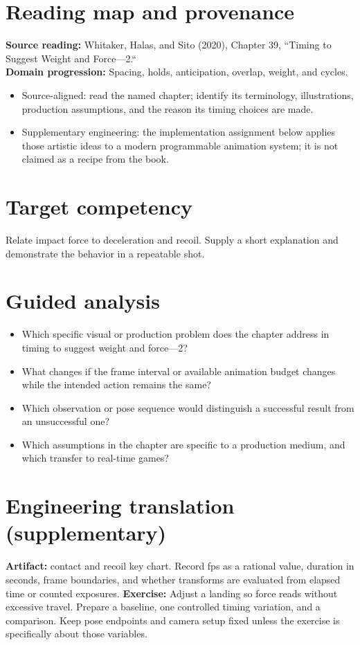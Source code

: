 \documentclass[10pt,letterpaper]{article}
\begin{document}
\makedoctitle
\makedocsummary

\section{Reading map and provenance}
\textbf{Source reading:} Whitaker, Halas, and Sito (2020), Chapter 39, ``Timing to Suggest Weight and Force—2.``\\
\textbf{Domain progression:} Spacing, holds, anticipation, overlap, weight, and cycles.
\begin{itemize}
\item Source-aligned: read the named chapter; identify its terminology, illustrations, production assumptions, and the reason its timing choices are made.
\item Supplementary engineering: the implementation assignment below applies those artistic ideas to a modern programmable animation system; it is not claimed as a recipe from the book.
\end{itemize}
\section{Target competency}
Relate impact force to deceleration and recoil. Supply a short explanation and demonstrate the behavior in a repeatable shot.
\section{Guided analysis}
\begin{itemize}
\item Which specific visual or production problem does the chapter address in timing to suggest weight and force—2?
\item What changes if the frame interval or available animation budget changes while the intended action remains the same?
\item Which observation or pose sequence would distinguish a successful result from an unsuccessful one?
\item Which assumptions in the chapter are specific to a production medium, and which transfer to real-time games?
\end{itemize}
\section{Engineering translation (supplementary)}
\textbf{Artifact:} contact and recoil key chart. Record fps as a rational value, duration in seconds, frame boundaries, and whether transforms are evaluated from elapsed time or counted exposures.
\textbf{Exercise:} Adjust a landing so force reads without excessive travel. Prepare a baseline, one controlled timing variation, and a comparison. Keep pose endpoints and camera setup fixed unless the exercise is specifically about those variables.
\end{document}
